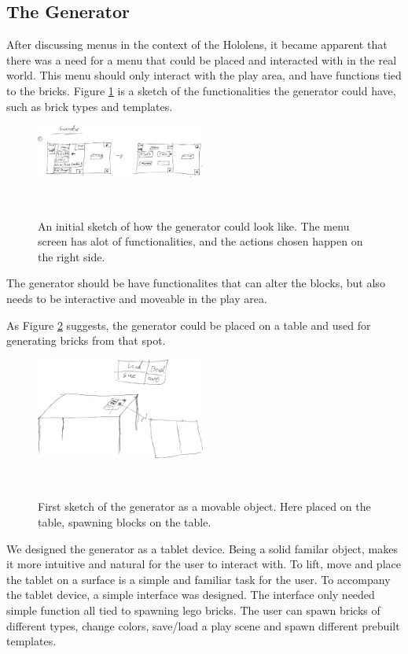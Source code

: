 \subsection{The Generator}
After discussing menus in the context of the Hololens, it became apparent that there was a need for a menu that could be placed and interacted with in the real world. This menu should only interact with the play area, and have functions tied to the bricks. Figure \ref{fig:genboard1} is a sketch of the functionalities the generator could have, such as brick types and templates.
\begin{figure}[t]
	\centering
	\includegraphics[width=210px]{figures/Generator/gen5_1.pdf}
	\caption{An initial sketch of how the generator could look like. The menu screen has alot of functionalities, and the actions chosen happen on the right side.}~\label{fig:genboard1}
\end{figure}
The generator should be have functionalites that can alter the blocks, but also needs to be interactive and moveable in the play area.\par
As Figure \ref{fig:gentablet} suggests, the generator could be placed on a table and used for generating bricks from that spot.
\begin{figure}[t]
	\centering
	\includegraphics[width=210px]{figures/Generator/gen6_1.pdf}
	\caption{First sketch of the generator as a movable object. Here placed on the table, spawning blocks on the table.}~\label{fig:gentablet}
\end{figure}
We designed the generator as a tablet device. Being a solid familar object, makes it more intuitive and natural for the user to interact with. To lift, move and place the tablet on a surface is a simple and familiar task for the user. To accompany the tablet device, a simple interface was designed. The interface only needed simple function all tied to spawning lego bricks. The user can spawn bricks of different types, change colors, save/load a play scene and spawn different prebuilt templates.
